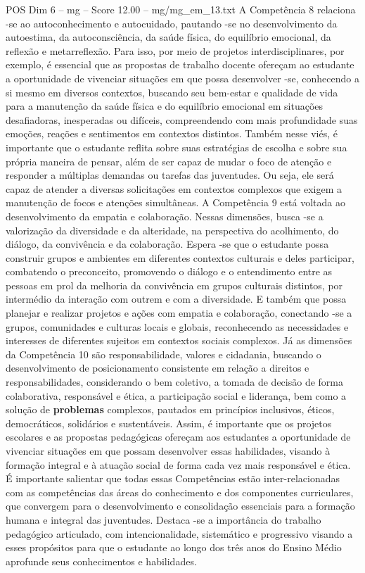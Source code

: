 \begin{textsample}{POS Dim 6 – mg – Score 12.00 – mg/mg\_em\_13.txt}
A Competência 8 relaciona -se ao autoconhecimento e autocuidado, pautando -se no desenvolvimento da autoestima, da autoconsciência, da saúde física, do equilíbrio emocional, da reflexão e metarreflexão.
Para isso, por meio de projetos interdisciplinares, por exemplo, é essencial que as propostas de trabalho docente ofereçam ao estudante a oportunidade de vivenciar situações em que possa desenvolver -se, conhecendo a si mesmo em diversos contextos, buscando seu bem-estar e qualidade de vida para a manutenção da saúde física e do equilíbrio emocional em situações desafiadoras, inesperadas ou difíceis, compreendendo com mais profundidade suas emoções, reações e sentimentos em contextos distintos.
Também nesse viés, é importante que o estudante reflita sobre suas estratégias de escolha e sobre sua própria maneira de pensar, além de ser capaz de mudar o foco de atenção e responder a múltiplas demandas ou tarefas das juventudes.
Ou seja, ele será capaz de atender a diversas solicitações em contextos complexos que exigem a manutenção de focos e atenções simultâneas.
A Competência 9 está voltada ao desenvolvimento da empatia e colaboração.
Nessas dimensões, busca -se a valorização da diversidade e da alteridade, na perspectiva do acolhimento, do diálogo, da convivência e da colaboração.
Espera -se que o estudante possa construir grupos e ambientes em diferentes contextos culturais e deles participar, combatendo o preconceito, promovendo o diálogo e o entendimento entre as pessoas em prol da melhoria da convivência em grupos culturais distintos, por intermédio da interação com outrem e com a diversidade.
E também que possa planejar e realizar projetos e ações com empatia e colaboração, conectando -se a grupos, comunidades e culturas locais e globais, reconhecendo as necessidades e interesses de diferentes sujeitos em contextos sociais complexos.
Já as dimensões da Competência 10 são responsabilidade, valores e cidadania, buscando o desenvolvimento de posicionamento consistente em relação a direitos e responsabilidades, considerando o bem coletivo, a tomada de decisão de forma colaborativa, responsável e ética, a participação social e liderança, bem como a solução de \textbf{problemas} complexos, pautados em princípios inclusivos, éticos, democráticos, solidários e sustentáveis.
Assim, é importante que os projetos escolares e as propostas pedagógicas ofereçam aos estudantes a oportunidade de vivenciar situações em que possam desenvolver essas habilidades, visando à formação integral e à atuação social de forma cada vez mais responsável e ética.
É importante salientar que todas essas Competências estão inter-relacionadas com as competências das áreas do conhecimento e dos componentes curriculares, que convergem para o desenvolvimento e consolidação essenciais para a formação humana e integral das juventudes.
Destaca -se a importância do trabalho pedagógico articulado, com intencionalidade, sistemático e progressivo visando a esses propósitos para que o estudante ao longo dos três anos do Ensino Médio aprofunde seus conhecimentos e habilidades.

\end{textsample}
